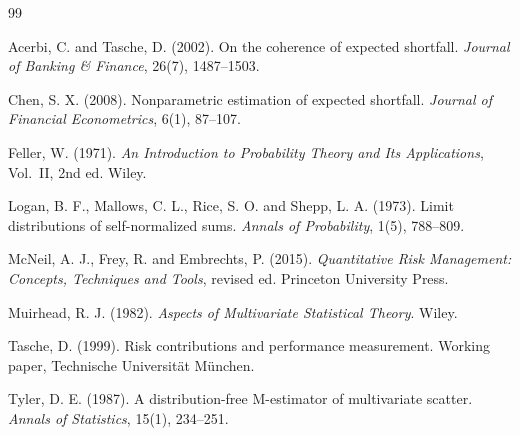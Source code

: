 \documentclass[11pt,UTF8]{ctexart}
\begin{document}

\begin{thebibliography}{99}

Acerbi, C. and Tasche, D. (2002). On the coherence of expected shortfall. \emph{Journal of Banking \& Finance},
26(7), 1487--1503.

Chen, S. X. (2008). Nonparametric estimation of expected shortfall. \emph{Journal of Financial Econometrics},
6(1), 87--107.

Feller, W. (1971). \emph{An Introduction to Probability Theory and Its Applications}, Vol.~II, 2nd ed. Wiley.

Logan, B. F., Mallows, C. L., Rice, S. O. and Shepp, L. A. (1973). Limit distributions of self-normalized sums.
\emph{Annals of Probability}, 1(5), 788--809.

McNeil, A. J., Frey, R. and Embrechts, P. (2015). \emph{Quantitative Risk Management: Concepts, Techniques and
Tools}, revised ed. Princeton University Press.

Muirhead, R. J. (1982). \emph{Aspects of Multivariate Statistical Theory}. Wiley.

Tasche, D. (1999). Risk contributions and performance measurement. Working paper, Technische Universit\"at
M\"unchen.

Tyler, D. E. (1987). A distribution-free M-estimator of multivariate scatter. \emph{Annals of Statistics},
15(1), 234--251.

\end{thebibliography}
\end{document}
